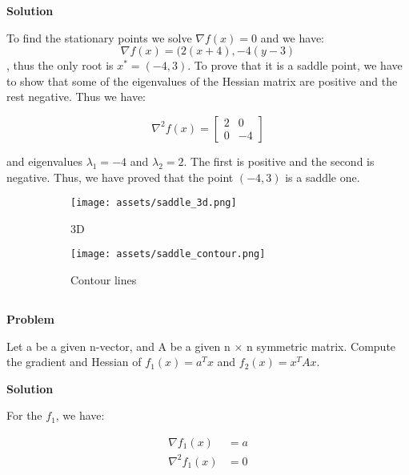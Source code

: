 \documentclass[a4paper,11pt]{article}
\numberwithin{equation}{section} %
\begin{document}
\textbf{Solution}


To find the stationary points we solve $\nabla f(x) = 0$ and we have:
\begin{equation}
    \nabla f(x) = (2(x+4), -4(y-3)
\end{equation}
, thus the only root is $x^{*} = (-4, 3)$. To prove that it is a saddle point, we have to show that some of the eigenvalues of the Hessian matrix are positive and the rest negative. Thus we have:

\begin{equation}
    \nabla^2 f(x) = 
    \begin{bmatrix}
        2 & 0 \\
        0 & -4
    \end{bmatrix}
\end{equation}

and eigenvalues $\lambda_1 = -4$ and $\lambda_2 = 2$. The first is positive and the second is negative. Thus, we have proved that the point $(-4, 3)$ is a saddle one.

\begin{figure}[h!]
     \centering
     \begin{subfigure}[b]{0.45\textwidth}
         \centering
         \texttt{[image: assets/saddle\_3d.png]}
         \caption{3D}
     \end{subfigure}
     \hfill
     \begin{subfigure}[b]{0.45\textwidth}
         \centering
         \texttt{[image: assets/saddle\_contour.png]}
         \caption{Contour lines}
     \end{subfigure}
    \caption{}
\end{figure}

\subsection{}

\textbf{Problem}

Let a be a given n-vector, and A be a given n × n symmetric matrix. Compute the
gradient and Hessian of $f_1(x) = a^T x$ and $f_2(x) = x^TAx$.

\textbf{Solution}

For the $f_1$, we have:

\begin{align}
    \nabla f_1(x) &= a \\
    \nabla^2 f_1(x) &= 0
\end{align}
\end{document}
